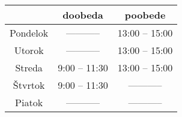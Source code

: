 \begin{tabular}{|c|c|c|}
  \hline
                 &  doobeda    	  & poobede        \\
  \hline
  \hline
    Pondelok     & -----------    & 13:00 -- 15:00 \\
  \hline
    Utorok       & -----------    & 13:00 -- 15:00 \\
  \hline
    Streda       & 9:00 -- 11:30  & 13:00 -- 15:00 \\
  \hline
    Štvrtok      & 9:00 -- 11:30  & -----------    \\
  \hline
    Piatok       &   -----------  & -----------    \\
  \hline
\end{tabular}